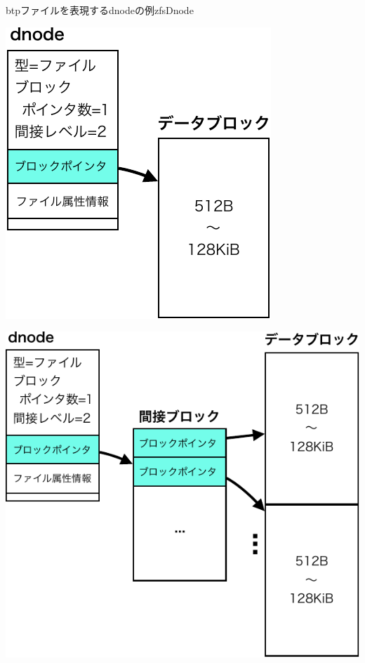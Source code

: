 \begin{myfig}{btp}{ファイルを表現するdnodeの例}{zfsDnode}
  \centering
  \begin{minipage}{0.4\columnwidth}
    \centering\includegraphics[scale=0.75]{Fig/zfsDnodeDirect-crop.pdf}
    \label{fig:zfsDnodeDirect}
  \end{minipage}
  \begin{minipage}{0.58\columnwidth}
    \centering\includegraphics[scale=0.75]{Fig/zfsDnodeIndirect-crop.pdf}
    \label{fig:zfsDnodeIndirect}
  \end{minipage}
\end{myfig}

